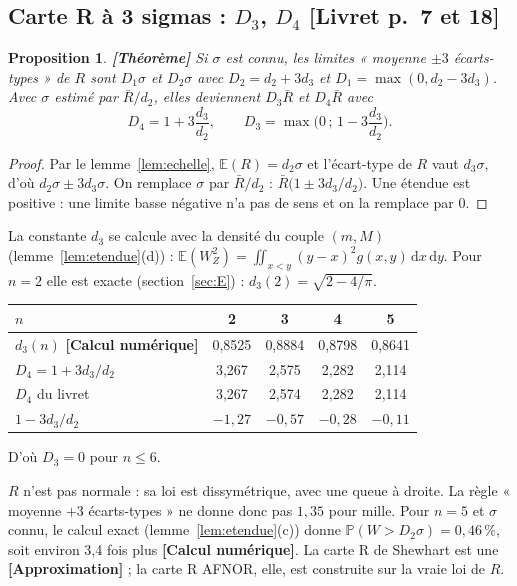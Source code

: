 \documentclass[11pt,a4paper]{article}
\theoremstyle{tq}
\newtheorem{prop}{Proposition}
\theoremstyle{remark}
\newcommand{\thm}{\textcolor{vertTQ}{\textbf{[Théorème]}}}
\newcommand{\appr}{\textcolor{uimmred}{\textbf{[Approximation]}}}
\newcommand{\num}{\textcolor{uimmblue}{\textbf{[Calcul numérique]}}}
\newcommand{\liv}[1]{\textcolor{uimmblue}{\small[Livret p.~#1]}}
\newcommand{\E}{\mathbb{E}}
\renewcommand{\P}{\mathbb{P}}
\newcommand{\Rb}{\bar{R}}
\newcommand{\dd}{\,\mathrm{d}}
\begin{document}
\subsection{Carte R à 3 sigmas : $D_3$, $D_4$ \liv{7 et 18}}
\begin{prop}\thm{}
Si $\sigma$ est connu, les limites « moyenne $\pm3$ écarts-types » de $R$ sont $D_1\sigma$ et $D_2\sigma$ avec $D_2=d_2+3d_3$ et $D_1=\max(0,d_2-3d_3)$. Avec $\sigma$ estimé par $\Rb/d_2$, elles deviennent $D_3\Rb$ et $D_4\Rb$ avec
\[
D_4=1+3\frac{d_3}{d_2},\qquad D_3=\max\Big(0\,;\,1-3\frac{d_3}{d_2}\Big).
\]
\end{prop}
\begin{proof}
Par le lemme~\ref{lem:echelle}, $\E(R)=d_2\sigma$ et l'écart-type de $R$ vaut $d_3\sigma$, d'où $d_2\sigma\pm3d_3\sigma$. On remplace $\sigma$ par $\Rb/d_2$ : $\Rb\big(1\pm3d_3/d_2\big)$. Une étendue est positive : une limite basse négative n'a pas de sens et on la remplace par 0.
\end{proof}
La constante $d_3$ se calcule avec la densité du couple $(m,M)$ (lemme~\ref{lem:etendue}(d)) : $\E(W_Z^2)=\iint_{x<y}(y-x)^2g(x,y)\dd x\dd y$. Pour $n=2$ elle est exacte (section~\ref{sec:E}) : $d_3(2)=\sqrt{2-4/\pi}$.
\begin{center}\small
\begin{tabular}{@{}lcccc@{}}
\toprule
$n$ & 2 & 3 & 4 & 5\\
\midrule
$d_3(n)$ \num{} & 0,8525 & 0,8884 & 0,8798 & 0,8641\\
$D_4=1+3d_3/d_2$ & 3,267 & 2,575 & 2,282 & 2,114\\
$D_4$ du livret & 3,267 & 2,574 & 2,282 & 2,114\\
$1-3d_3/d_2$ & $-1{,}27$ & $-0{,}57$ & $-0{,}28$ & $-0{,}11$\\
\bottomrule
\end{tabular}
\end{center}
D'où $D_3=0$ pour $n\le6$.

\begin{alerte}
$R$ n'est pas normale : sa loi est dissymétrique, avec une queue à droite. La règle « moyenne $+3$ écarts-types » ne donne donc pas $1{,}35$ pour mille. Pour $n=5$ et $\sigma$ connu, le calcul exact (lemme~\ref{lem:etendue}(c)) donne $\P(W>D_2\sigma)=0{,}46\,\%$, soit environ 3,4 fois plus \num{}. La carte R de Shewhart est une \appr{} ; la carte R AFNOR, elle, est construite sur la vraie loi de $R$.
\end{alerte}
\end{document}
